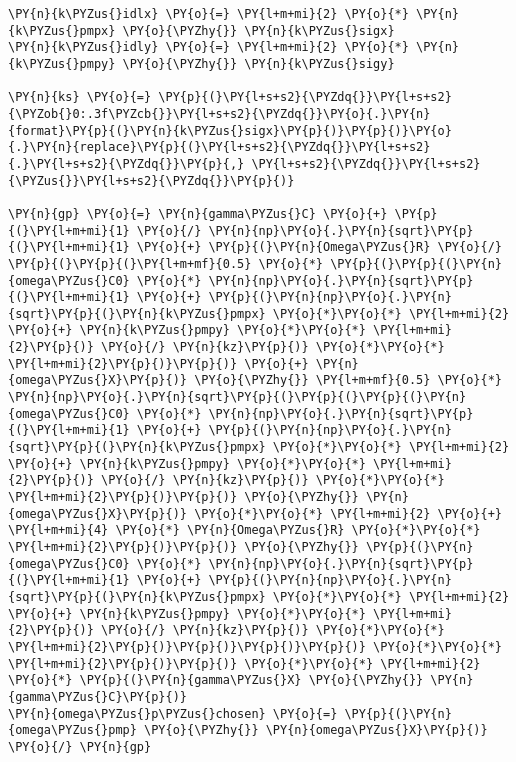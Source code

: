 \begin{Verbatim}[commandchars=\\\{\}]
\PY{n}{k\PYZus{}idlx} \PY{o}{=} \PY{l+m+mi}{2} \PY{o}{*} \PY{n}{k\PYZus{}pmpx} \PY{o}{\PYZhy{}} \PY{n}{k\PYZus{}sigx}
\PY{n}{k\PYZus{}idly} \PY{o}{=} \PY{l+m+mi}{2} \PY{o}{*} \PY{n}{k\PYZus{}pmpy} \PY{o}{\PYZhy{}} \PY{n}{k\PYZus{}sigy}

\PY{n}{ks} \PY{o}{=} \PY{p}{(}\PY{l+s+s2}{\PYZdq{}}\PY{l+s+s2}{\PYZob{}0:.3f\PYZcb{}}\PY{l+s+s2}{\PYZdq{}}\PY{o}{.}\PY{n}{format}\PY{p}{(}\PY{n}{k\PYZus{}sigx}\PY{p}{)}\PY{p}{)}\PY{o}{.}\PY{n}{replace}\PY{p}{(}\PY{l+s+s2}{\PYZdq{}}\PY{l+s+s2}{.}\PY{l+s+s2}{\PYZdq{}}\PY{p}{,} \PY{l+s+s2}{\PYZdq{}}\PY{l+s+s2}{\PYZus{}}\PY{l+s+s2}{\PYZdq{}}\PY{p}{)}

\PY{n}{gp} \PY{o}{=} \PY{n}{gamma\PYZus{}C} \PY{o}{+} \PY{p}{(}\PY{l+m+mi}{1} \PY{o}{/} \PY{n}{np}\PY{o}{.}\PY{n}{sqrt}\PY{p}{(}\PY{l+m+mi}{1} \PY{o}{+} \PY{p}{(}\PY{n}{Omega\PYZus{}R} \PY{o}{/} \PY{p}{(}\PY{p}{(}\PY{l+m+mf}{0.5} \PY{o}{*} \PY{p}{(}\PY{p}{(}\PY{n}{omega\PYZus{}C0} \PY{o}{*} \PY{n}{np}\PY{o}{.}\PY{n}{sqrt}\PY{p}{(}\PY{l+m+mi}{1} \PY{o}{+} \PY{p}{(}\PY{n}{np}\PY{o}{.}\PY{n}{sqrt}\PY{p}{(}\PY{n}{k\PYZus{}pmpx} \PY{o}{*}\PY{o}{*} \PY{l+m+mi}{2} \PY{o}{+} \PY{n}{k\PYZus{}pmpy} \PY{o}{*}\PY{o}{*} \PY{l+m+mi}{2}\PY{p}{)} \PY{o}{/} \PY{n}{kz}\PY{p}{)} \PY{o}{*}\PY{o}{*} \PY{l+m+mi}{2}\PY{p}{)}\PY{p}{)} \PY{o}{+} \PY{n}{omega\PYZus{}X}\PY{p}{)} \PY{o}{\PYZhy{}} \PY{l+m+mf}{0.5} \PY{o}{*} \PY{n}{np}\PY{o}{.}\PY{n}{sqrt}\PY{p}{(}\PY{p}{(}\PY{p}{(}\PY{n}{omega\PYZus{}C0} \PY{o}{*} \PY{n}{np}\PY{o}{.}\PY{n}{sqrt}\PY{p}{(}\PY{l+m+mi}{1} \PY{o}{+} \PY{p}{(}\PY{n}{np}\PY{o}{.}\PY{n}{sqrt}\PY{p}{(}\PY{n}{k\PYZus{}pmpx} \PY{o}{*}\PY{o}{*} \PY{l+m+mi}{2} \PY{o}{+} \PY{n}{k\PYZus{}pmpy} \PY{o}{*}\PY{o}{*} \PY{l+m+mi}{2}\PY{p}{)} \PY{o}{/} \PY{n}{kz}\PY{p}{)} \PY{o}{*}\PY{o}{*} \PY{l+m+mi}{2}\PY{p}{)}\PY{p}{)} \PY{o}{\PYZhy{}} \PY{n}{omega\PYZus{}X}\PY{p}{)} \PY{o}{*}\PY{o}{*} \PY{l+m+mi}{2} \PY{o}{+} \PY{l+m+mi}{4} \PY{o}{*} \PY{n}{Omega\PYZus{}R} \PY{o}{*}\PY{o}{*} \PY{l+m+mi}{2}\PY{p}{)}\PY{p}{)} \PY{o}{\PYZhy{}} \PY{p}{(}\PY{n}{omega\PYZus{}C0} \PY{o}{*} \PY{n}{np}\PY{o}{.}\PY{n}{sqrt}\PY{p}{(}\PY{l+m+mi}{1} \PY{o}{+} \PY{p}{(}\PY{n}{np}\PY{o}{.}\PY{n}{sqrt}\PY{p}{(}\PY{n}{k\PYZus{}pmpx} \PY{o}{*}\PY{o}{*} \PY{l+m+mi}{2} \PY{o}{+} \PY{n}{k\PYZus{}pmpy} \PY{o}{*}\PY{o}{*} \PY{l+m+mi}{2}\PY{p}{)} \PY{o}{/} \PY{n}{kz}\PY{p}{)} \PY{o}{*}\PY{o}{*} \PY{l+m+mi}{2}\PY{p}{)}\PY{p}{)}\PY{p}{)}\PY{p}{)} \PY{o}{*}\PY{o}{*} \PY{l+m+mi}{2}\PY{p}{)}\PY{p}{)} \PY{o}{*}\PY{o}{*} \PY{l+m+mi}{2} \PY{o}{*} \PY{p}{(}\PY{n}{gamma\PYZus{}X} \PY{o}{\PYZhy{}} \PY{n}{gamma\PYZus{}C}\PY{p}{)}
\PY{n}{omega\PYZus{}p\PYZus{}chosen} \PY{o}{=} \PY{p}{(}\PY{n}{omega\PYZus{}pmp} \PY{o}{\PYZhy{}} \PY{n}{omega\PYZus{}X}\PY{p}{)} \PY{o}{/} \PY{n}{gp}


\end{Verbatim}
